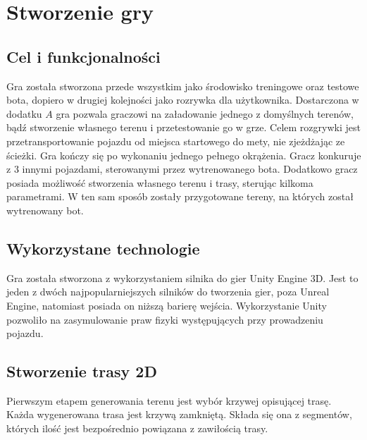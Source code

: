 \chapter{Stworzenie gry}
\thispagestyle{chapterBeginStyle}
\label{rozdzial1}


\section{Cel i funkcjonalności}
Gra została stworzona przede wszystkim jako środowisko treningowe oraz testowe bota, dopiero w drugiej kolejności jako rozrywka dla użytkownika. Dostarczona w dodatku $A$ gra pozwala graczowi na załadowanie jednego z domyślnych terenów, bądź stworzenie własnego terenu i przetestowanie go w grze. Celem rozgrywki jest przetransportowanie pojazdu od miejsca startowego do mety, nie zjeżdżając ze ścieżki. Gra kończy się po wykonaniu jednego pełnego okrążenia. Gracz konkuruje z 3 innymi pojazdami, sterowanymi przez wytrenowanego bota. Dodatkowo gracz posiada możliwość stworzenia własnego terenu i trasy, sterując kilkoma parametrami. W ten sam sposób zostały przygotowane tereny, na których został wytrenowany bot.

\section{Wykorzystane technologie}
Gra została stworzona z wykorzystaniem silnika do gier Unity Engine 3D. Jest to jeden z dwóch najpopularniejszych silników do tworzenia gier, poza Unreal Engine, natomiast posiada on niższą barierę wejścia. Wykorzystanie Unity pozwoliło na zasymulowanie praw fizyki występujących przy prowadzeniu pojazdu.

\section{Stworzenie trasy 2D}
Pierwszym etapem generowania terenu jest wybór krzywej opisującej trasę. Każda wygenerowana trasa jest krzywą zamkniętą. Składa się ona z segmentów, których ilość jest bezpośrednio powiązana z zawiłością trasy. 

